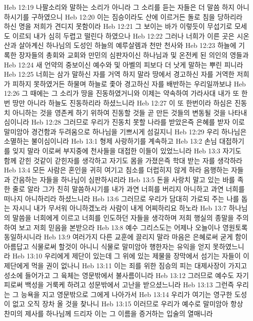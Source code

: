 Heb 12:19  나팔소리와 말하는 소리가 아니라 그 소리를 듣는 자들은 더 말씀 하지 아니하시기를 구하였으니
Heb 12:20  이는 짐승이라도 산에 이르거든 돌로 침을 당하리라 하신 명을 저희가 견디지 못함이라
Heb 12:21  그 보이는 바가 이렇듯이 무섭기로 모세도 이르되 내가 심히 두렵고 떨린다 하였으나
Heb 12:22  그러나 너희가 이른 곳은 시온산과 살아계신 하나님의 도성인 하늘의 예루살렘과 천만 천사와
Heb 12:23  하늘에 기록한 장자들의 총회와 교회와 만민의 심판자이신 하나님과 및 온전케 된 의인의 영들과
Heb 12:24  새 언약의 중보이신 예수와 및 아벨의 피보다 더 낫게 말하는 뿌린 피니라
Heb 12:25  너희는 삼가 말하신 자를 거역 하지 말라 땅에서 경고하신 자를 거역한 저희가 피하지 못하였거든 하물며 하늘로 좇아 경고하신 자를 배반하는 우리일까보냐
Heb 12:26  그 때에는 그 소리가 땅을 진동하였거니와 이제는 약속하여 가라사대 내가 또 한번 땅만 아니라 하늘도 진동하리라 하셨느니라
Heb 12:27  이 또 한번이라 하심은 진동치 아니하는 것을 영존케 하기 위하여 진동할 것들 곧 만든 것들의 변동될 것을 나타내심이니라
Heb 12:28  그러므로 우리가 진동치 못할 나라를 받았은즉 은혜를 받자 이로 말미암아 경건함과 두려움으로 하나님을 기쁘시게 섬길지니
Heb 12:29  우리 하나님은 소멸하는 불이심이니라
Heb 13:1  형제 사랑하기를 계속하고
Heb 13:2  손님 대접하기를 잊지 말라 이로써 부지중에 천사들을 대접한 이들이 있었느니라
Heb 13:3  자기도 함께 갇힌 것같이 갇힌자를 생각하고 자기도 몸을 가졌은즉 학대 받는 자를 생각하라
Heb 13:4  모든 사람은 혼인을 귀히 여기고 침소를 더럽히지 않게 하라 음행하는 자들과 간음하는 자들을 하나님이 심판하시리라
Heb 13:5  돈을 사랑치 말고 있는 바를 족한 줄로 알라 그가 친히 말씀하시기를 내가 과연 너희를 버리지 아니하고 과연 너희를 떠나지 아니하리라 하셨느니라
Heb 13:6  그러므로 우리가 담대히 가로되 주는 나를 돕는 자시니 내가 무서워 아니하겠노라 사람이 내게 어찌하리요 하노라
Heb 13:7  하나님의 말씀을 너희에게 이르고 너희를 인도하던 자들을 생각하며 저희 행실의 종말을 주의하여 보고 저희 믿음을 본받으라
Heb 13:8  예수 그리스도는 어제나 오늘이나 영원토록 동일하시니라
Heb 13:9  여러가지 다른 교훈에 끌리지 말라 마음은 은혜로써 굳게 함이 아름답고 식물로써 할것이 아니니 식물로 말미암아 행한자는 유익을 얻지 못하였느니라
Heb 13:10  우리에게 제단이 있는데 그 위에 있는 제물을 장막에서 섬기는 자들이 이 제단에게 먹을 권이 없나니
Heb 13:11  이는 죄를 위한 짐승의 피는 대제사장이 가지고 성소에 들어가고 그 육체는 영문밖에서 불사름이니라
Heb 13:12  그러므로 예수도 자기 피로써 백성을 거룩케 하려고 성문밖에서 고난을 받으셨느니라
Heb 13:13  그런즉 우리는 그 능욕을 지고 영문밖으로 그에게 나아가서
Heb 13:14  우리가 여기는 영구한 도성이 없고 오직 장차 올 것을 찾나니
Heb 13:15  이러므로 우리가 예수로 말미암아 항상 찬미의 제사를 하나님께 드리자 이는 그 이름을 증거하는 입술의 열매니라
